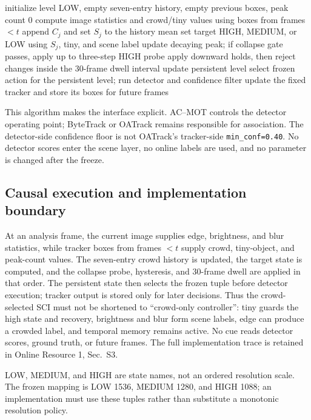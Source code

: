 \begin{algorithm}[t]\caption{Frozen controller used by AC--MOT v3}\label{alg:v3}
\begin{algorithmic}[1]
\State initialize level LOW, empty seven-entry history, empty previous boxes, peak count 0
\State compute image statistics and crowd/tiny values using boxes from frames $<t$
\State append $C_j$ and set $S_j$ to the history mean
\State set target HIGH, MEDIUM, or LOW using $S_j$, tiny, and scene label
\State update decaying peak; if collapse gate passes, apply up to three-step HIGH probe
\State apply downward holds, then reject changes inside the 30-frame dwell interval
\State update persistent level
\EndIf
\State select frozen action for the persistent level; run detector and confidence filter
\State update the fixed tracker and store its boxes for future frames
\EndFor
\end{algorithmic}\end{algorithm}

This algorithm makes the interface explicit. AC--MOT controls the detector operating point; ByteTrack or OATrack remains responsible for association. The detector-side confidence floor is not OATrack's tracker-side \texttt{min\_conf=0.40}. No detector scores enter the scene layer, no online labels are used, and no parameter is changed after the freeze.

\subsection{Causal execution and implementation boundary}
At an analysis frame, the current image supplies edge, brightness, and blur
statistics, while tracker boxes from frames $<t$ supply crowd, tiny-object, and
peak-count values. The seven-entry crowd history is updated, the target state is
computed, and the collapse probe, hysteresis, and 30-frame dwell are applied in
that order. The persistent state then selects the frozen tuple before detector
execution; tracker output is stored only for later decisions. Thus the
crowd-selected SCI must not be shortened to ``crowd-only controller'': tiny
guards the high state and recovery, brightness and blur form scene labels, edge
can produce a crowded label, and temporal memory remains active. No cue reads
detector scores, ground truth, or future frames. The full implementation trace
is retained in Online Resource 1, Sec.~S3.

LOW, MEDIUM, and HIGH are state names, not an ordered resolution scale. The
frozen mapping is LOW 1536, MEDIUM 1280, and HIGH 1088; an implementation must
use these tuples rather than substitute a monotonic resolution policy.
